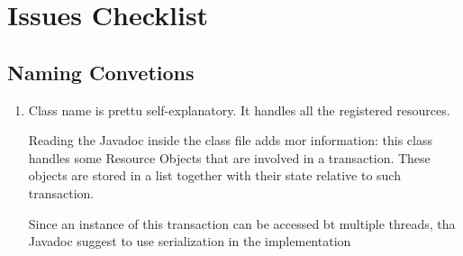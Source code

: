 \section{Issues Checklist}
\subsection{Naming Convetions}
\begin{enumerate}
	\item Class name is prettu self-explanatory. It handles all the registered resources.
	
	Reading the Javadoc inside the class file adds mor information: this class handles some Resource Objects that are involved in a transaction. These objects are stored in a list together with their state relative to such transaction.
	
	Since an instance of this transaction can be accessed bt multiple threads, tha Javadoc suggest to use serialization in the implementation
	

\end{enumerate}
